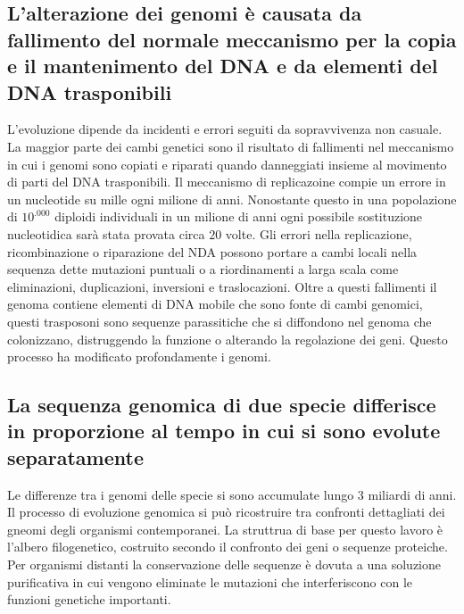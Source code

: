 \subsection{L'alterazione dei genomi \`e causata da fallimento del normale meccanismo per la copia e il mantenimento del DNA e da elementi del DNA trasponibili}
L'evoluzione dipende da incidenti e errori seguiti da sopravvivenza non casuale. La maggior parte dei cambi genetici sono il risultato di fallimenti nel meccanismo in cui i genomi
sono copiati e riparati quando danneggiati insieme al movimento di parti del DNA trasponibili. Il meccanismo di replicazoine compie un errore in un nucleotide su mille ogni milione di
anni. Nonostante questo in una popolazione di $10^.000$ diploidi individuali in un milione di anni ogni possibile sostituzione nucleotidica sar\`a stata provata circa $20$ volte. Gli
errori nella replicazione, ricombinazione o riparazione del NDA possono portare a cambi locali nella sequenza dette mutazioni puntuali o a riordinamenti a larga scala come eliminazioni, 
duplicazioni, inversioni e traslocazioni. Oltre a questi fallimenti il genoma contiene elementi di DNA mobile che sono fonte di cambi genomici, questi trasposoni sono sequenze 
parassitiche che si diffondono nel genoma che colonizzano, distruggendo la funzione o alterando la regolazione dei geni. Questo processo ha modificato profondamente i genomi.
\subsection{La sequenza genomica di due specie differisce in proporzione al tempo in cui si sono evolute separatamente}
Le differenze tra i genomi delle specie si sono accumulate lungo $3$ miliardi di anni. Il processo di evoluzione genomica si pu\`o ricostruire tra confronti dettagliati dei gneomi degli
organismi contemporanei. La struttrua di base per questo lavoro \`e l'albero filogenetico, costruito secondo il confronto dei geni o sequenze proteiche. Per organismi distanti la 
conservazione delle sequenze \`e dovuta a una soluzione purificativa in cui vengono eliminate le mutazioni che interferiscono con le funzioni genetiche importanti. 
